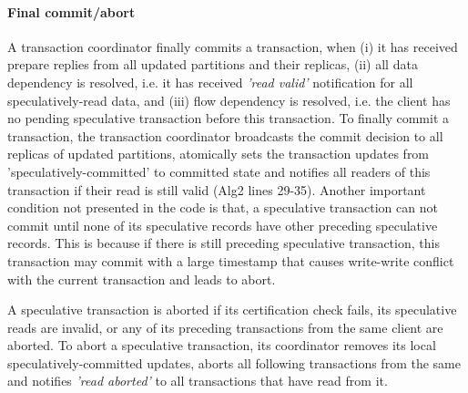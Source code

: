 \paragraph{Final commit/abort} A transaction coordinator finally commits a transaction, when (i) it has received prepare replies from all updated partitions and their replicas, (ii) all data dependency is resolved, i.e. it has received \textit{'read valid'} notification for all speculatively-read data, and (iii) flow dependency is resolved, i.e. the client has no pending speculative transaction before this transaction. To finally commit a transaction, the transaction coordinator broadcasts the commit decision to all replicas of updated partitions, atomically sets the transaction updates from 'speculatively-committed' to committed state and notifies all readers of this transaction if their read is still valid (Alg2 lines 29-35). Another important condition not presented in the code is that, a speculative transaction can not commit until none of its speculative records have other preceding speculative records. This is because if there is still preceding speculative transaction, this transaction may commit with a large timestamp that causes write-write conflict with the current transaction and leads to abort.

A speculative transaction is aborted if its certification check fails, its speculative reads are invalid, or any of its preceding transactions from the same  client are aborted. To abort a speculative transaction, its coordinator removes its local speculatively-committed updates, aborts all following transactions from the same and notifies \textit{'read aborted'} to all transactions that have read from it. 

